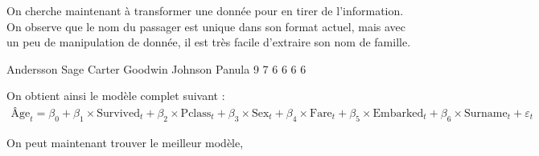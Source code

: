 \documentclass[11pt,french]{report}
\begin{document}
\bigskip
On cherche maintenant à transformer une donnée pour en tirer de l'information. On observe que le nom du passager est unique dans son format actuel, mais avec un peu de manipulation de donnée, il est très facile d'extraire son nom de famille.


\begin{Schunk}
\begin{Soutput}
Andersson      Sage    Carter   Goodwin   Johnson    Panula 
        9         7         6         6         6         6 
\end{Soutput}
\end{Schunk}

On obtient ainsi le modèle complet suivant :
\begin{align*}
\text{Âge}_t = \beta_0 + \beta_1 \times \text{Survived}_t + \beta_2 \times \text{Pclass}_t + \beta_3  \times \text{Sex}_t + \beta_4  \times \text{Fare}_t + \beta_5  \times \text{Embarked}_t + \beta_6  \times \text{Surname}_t + \varepsilon_t
\end{align*}

On peut maintenant trouver le meilleur modèle,
\end{document}
